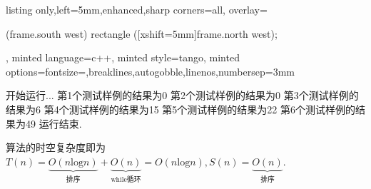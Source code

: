 \documentclass{article}
\begin{document}
\begin{homeworkProblem}
\begin{tcblisting}
{listing only,left=5mm,enhanced,sharp corners=all,
overlay={\begin{tcbclipinterior} (frame.south west)
rectangle ([xshift=5mm]frame.north west);\end{tcbclipinterior}},
minted language=c++,
minted style=tango,
minted options={fontsize=\small,breaklines,autogobble,linenos,numbersep=3mm}}
开始运行...
第1个测试样例的结果为0
第2个测试样例的结果为0
第3个测试样例的结果为6
第4个测试样例的结果为15
第5个测试样例的结果为22
第6个测试样例的结果为49
运行结束.
\end{tcblisting}
    \vspace*{-0.05cm}
    算法的时空复杂度即为$T\left( n \right) =\underset{\text{排序}}{\underbrace{O\left( n\text{log} n \right) }}+\underset{\text{while循环}}{\underbrace{O\left( n \right) }}=O\left( n\text{log} n \right) ,S\left( n \right) =\underset{\text{排序}}{\underbrace{O\left( n \right) }}$.
\end{homeworkProblem}





\end{document}
